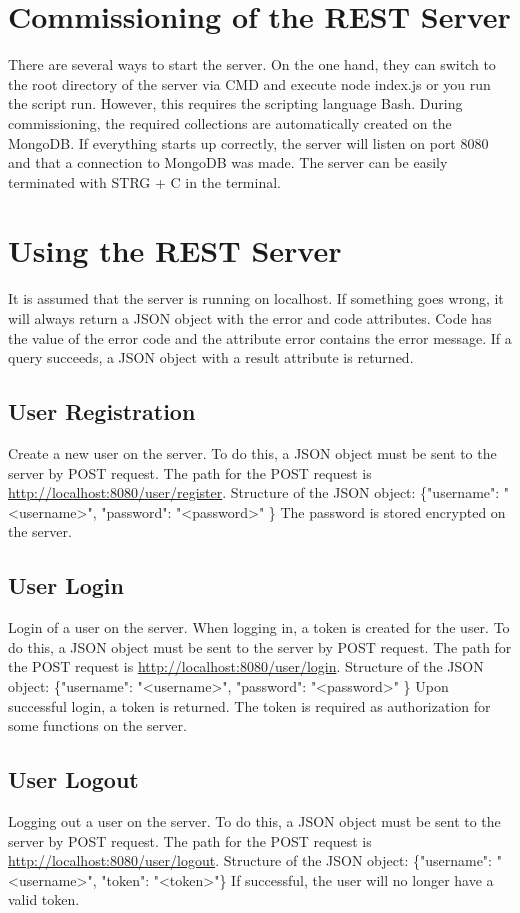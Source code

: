 \documentclass[12pt]{scrartcl}
\begin{document}
    \section{Commissioning of the REST Server}
        There are several ways to start the server.
        On the one hand, they can switch to the root directory of the server via CMD and execute node index.js or
        you run the script run. However, this requires the scripting language Bash.
        During commissioning, the required collections are automatically created on the MongoDB.
        If everything starts up correctly, the server will listen on port 8080
        and that a connection to MongoDB was made.
        The server can be easily terminated with STRG + C in the terminal.
    \section{Using the REST Server}
        It is assumed that the server is running on localhost.
        If something goes wrong, it will always return a JSON object with the error and code attributes.
        Code has the value of the error code and the attribute error contains the error message.
        If a query succeeds, a JSON object with a result attribute is returned.
    \subsection{User Registration}
        Create a new user on the server.
        To do this, a JSON object must be sent to the server by POST request. The path for the POST request is
        \url{http://localhost:8080/user/register}.
        Structure of the JSON object: \{"username": "<username>", "password": "<password>" \}
        The password is stored encrypted on the server.

    \subsection{User Login}
        Login of a user on the server. When logging in, a token is created for the user.
        To do this, a JSON object must be sent to the server by POST request. The path for the POST request is
        \url{http://localhost:8080/user/login}.
        Structure of the JSON object: \{"username": "<username>", "password": "<password>" \}
        Upon successful login, a token is returned. The token is required as authorization for some functions on the server.
    
    \subsection{User Logout}
        Logging out a user on the server.
        To do this, a JSON object must be sent to the server by POST request. The path for the POST request is
        \url{http://localhost:8080/user/logout}.
        Structure of the JSON object: \{"username": "<username>", "token": "<token>"\}
        If successful, the user will no longer have a valid token.
\end{document}
